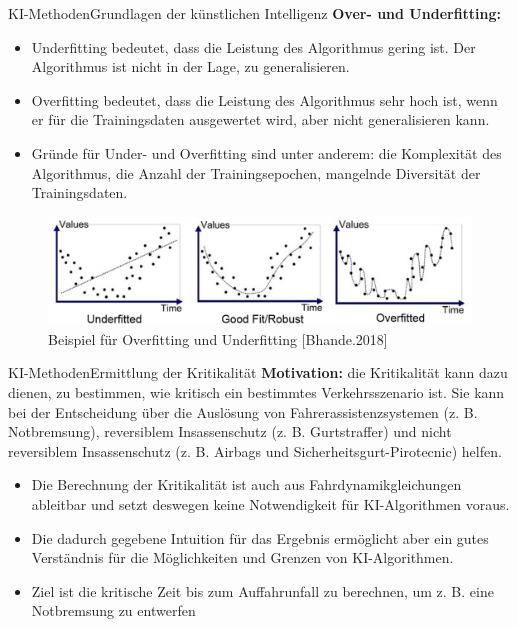 \documentclass[169, handout	]{THIbeamer} %
\begin{document}
	\begin{frame}{KI-Methoden}{Grundlagen der künstlichen Intelligenz}
		\footnotesize		
		\textbf{Over- und Underfitting:}	
		\begin{itemize}
			\item Underfitting bedeutet, dass die Leistung des Algorithmus gering ist. Der Algorithmus ist nicht in der Lage, zu generalisieren.		
			\item Overfitting bedeutet, dass die Leistung des Algorithmus sehr hoch ist, wenn er für die Trainingsdaten ausgewertet wird, aber nicht generalisieren kann.
			\item Gründe für Under- und Overfitting sind unter anderem: die Komplexität des Algorithmus, die Anzahl der Trainingsepochen, mangelnde Diversität der Trainingsdaten.
		\end{itemize}
		\begin{figure}
			\includegraphics[scale=0.25]{required/Over and Underfitting.png}
			\caption{\scriptsize Beispiel für Overfitting und Underfitting [Bhande.2018]}
        	\label{Over and Underfitting}
		\end{figure}
	\end{frame}
	\begin{frame}{KI-Methoden}{Ermittlung der Kritikalität}
		\textbf{Motivation: }die Kritikalität kann dazu dienen, zu bestimmen, wie kritisch ein bestimmtes Verkehrsszenario ist. Sie kann bei der Entscheidung über die Auslösung von Fahrerassistenzsystemen (z. B. Notbremsung), reversiblem Insassenschutz (z. B. Gurtstraffer) und nicht reversiblem Insassenschutz (z. B. Airbags und Sicherheitsgurt-Pirotecnic) helfen.
		\begin{itemize}
			\item Die Berechnung der Kritikalität ist auch aus Fahrdynamikgleichungen ableitbar und setzt deswegen keine Notwendigkeit für KI-Algorithmen voraus.
			\item Die dadurch gegebene Intuition für das Ergebnis ermöglicht aber ein gutes Verständnis für die Möglichkeiten und Grenzen von KI-Algorithmen.
			\item Ziel ist die kritische Zeit bis zum Auffahrunfall zu berechnen, um z. B. eine Notbremsung zu entwerfen
		\end{itemize}
	\end{frame}
\end{document}
